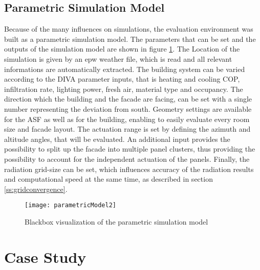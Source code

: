 			

		\subsection{Parametric Simulation Model}

			Because of the many influences on simulations, the evaluation environment was built as a parametric simulation model. The parameters that can be set and the outputs of the simulation model are shown in figure \ref{fig:parametricModel}. The Location of the simulation is given by an epw weather file, which is read and all relevant informations are automatically extracted. The building system can be varied according to the DIVA parameter inputs, that is heating and cooling COP, infiltration rate, lighting power, fresh air, material type and occupancy. The direction which the building and the facade are facing, can be set with a single number representing the deviation from south. Geometry settings are available for the ASF as well as for the building, enabling to easily evaluate every room size and facade layout. The actuation range is set by defining the azimuth and altitude angles, that will be evaluated. An additional input provides the possibility to split up the facade into multiple panel clusters, thus providing the possibility to account for the independent actuation of the panels. Finally, the radiation grid-size can be set, which influences accuracy of the radiation results and computational speed at the same time, as described in section \ref{ss:gridconvergence}. 

			\begin{figure}[ht] %
				\begin{center}
				\texttt{[image: parametricModel2]}
				\caption{Blackbox visualization of the parametric simulation model}
				\label{fig:parametricModel}
				\end{center} 
			\end{figure}

	\section{Case Study}

